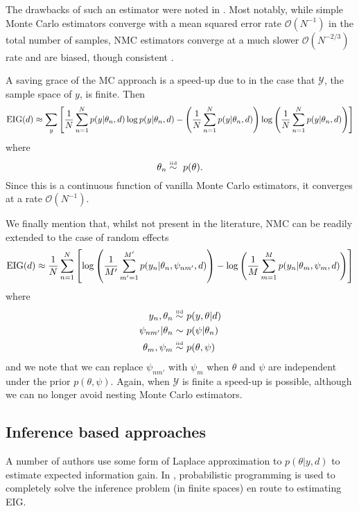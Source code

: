 The drawbacks of such an estimator were noted in \cite{nmc}. Most notably, while simple Monte Carlo estimators converge with a mean squared error rate $\mathcal{O}(N^{-1})$ in the total number of samples, NMC estimators converge at a much slower $\mathcal{O}(N^{-2/3})$ rate and are biased, though consistent \cite{nmc}.

A saving grace of the MC approach is a speed-up due to \cite{vincent2017} in the case that $\mathcal{Y}$, the sample space of $y$, is finite. Then
\begin{equation}
	\text{EIG}(d) \approx \sum_y \left[ \frac{1}{N}\sum_{n=1}^N p(y | \theta_n, d) \log p(y | \theta_n, d) -  \left(\frac{1}{N} \sum_{n=1}^N p(y | \theta_n, d) \right) \log \left( \frac{1}{N} \sum_{n=1}^N p(y | \theta_n, d) \right) \right]
\end{equation}
where
\begin{equation}
	\theta_n \simiid \ p(\theta).
\end{equation}
Since this is a continuous function of vanilla Monte Carlo estimators, it converges at a rate $\mathcal{O}(N^{-1})$.

We finally mention that, whilst not present in the literature, NMC can be readily extended to the case of random effects
\begin{equation}
	\text{EIG}(d) \approx \frac{1}{N}\sum_{n=1}^N \left[ \log \left(\frac{1}{M'} \sum_{m'=1}^{M'} p(y_n | \theta_n, \psi_{nm'}, d) \right) - \log \left(\frac{1}{M} \sum_{m=1}^M p(y_n | \theta_m, \psi_m, d) \right) \right]
\end{equation}
where
\begin{align}
	y_n, \theta_n \overset{\text{\tiny iid}}{\sim} & \ p(y, \theta | d) \\
	\psi_{nm'} | \theta_n \sim & \ p(\psi | \theta_n) \\
	\theta_m, \psi_m \overset{\text{\tiny iid}}{\sim} & \ p(\theta, \psi)
\end{align}
and we note that we can replace $\psi_{nm'}$ with $\psi_m$ when $\theta$ and $\psi$ are independent under the prior $p(\theta, \psi)$. Again, when $\mathcal{Y}$ is finite a speed-up is possible, although we can no longer avoid nesting Monte Carlo estimators.

\subsection{Inference based approaches}
A number of authors \cite{long2013, ryan2015} use some form of Laplace approximation to $p(\theta|y,d)$ to estimate expected information gain. In \cite{ouyang2016}, probabilistic programming is used to completely solve the inference problem (in finite spaces) en route to estimating EIG.

